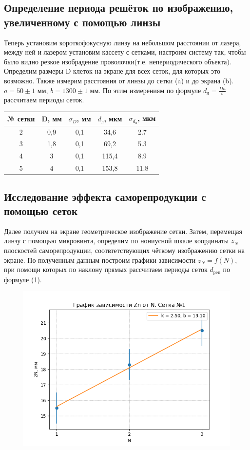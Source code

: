\documentclass[a4paper,12pt]{article}
\begin{document}
\subsection*{Определение периода решёток по изображению, увеличенному с помощью линзы}
Теперь установим короткофокусную линзу на небольшом расстоянии от лазера, между ней и лазером установим кассету с сетками, настроим систему так, чтобы было видно резкое изобрадение проволочки(т.е. непериодического объекта). Определим размеры D клеток на экране для всех сеток, для которых это возможно. Также измерим расстояния от линзы до сетки (a) и до экрана (b). $a = 50 \pm 1$ мм, $b = 1300 \pm 1$ мм. По этим измерениям по формуле $ d_\text{л} = \frac{Da}{b}$ рассчитаем периоды сеток.

\begin{table}[H]
	\centering
	\begin{tabular}{|c|c|c|c|c|}
	\hline
	№ сетки & D, мм & $\sigma_D$, мм & $d_\text{л}$, мкм & $\sigma_{d_\text{л}}$, мкм \\ \hline
	2 & 0,9 & 0,1 & 34,6 & 2.7 \\ \hline
	3 & 1,8 & 0,1 & 69,2 & 5.3 \\ \hline
	4 & 3 & 0,1 & 115,4 & 8.9 \\ \hline
	5 & 4 & 0,1 & 153,8 & 11.8 \\ \hline
	\end{tabular}
\end{table}

\subsection*{Исследование эффекта саморепродукции с помощью сеток}
Далее получим на экране геометрическое изображение сетки. Затем, перемещая линзу с помощью микровинта, определим по нониусной шкале координаты $z_N$ плоскостей саморепродукции, соотвтетствующих чёткому изображению сетки на экране. По полученным данным построим графики зависимости $z_N = f(N)$, при помощи которых по наклону прямых рассчитаем периоды сеток $d_\text{реп}$ по формуле (1).
\begin{figure}[H]
\centering
\includegraphics[scale=0.65]{1.png}

\end{figure}
\end{document}
